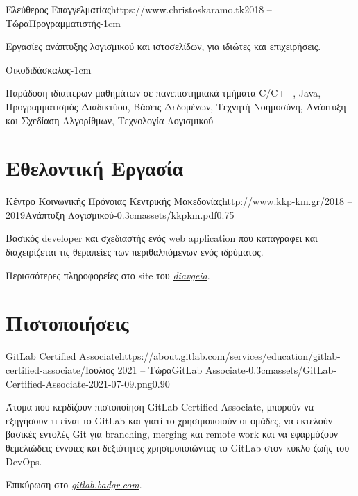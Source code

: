 \documentclass{mycv}
\begin{document}
	\begin{EntryDated}{Ελεύθερος Επαγγελματίας}{https://www.christoskaramo.tk}{2018 -- Τώρα}{Προγραμματιστής}{-1cm}
	\begin{Itemize}
		\item Εργασίες ανάπτυξης λογισμικού και ιστοσελίδων, για ιδιώτες και επιχειρήσεις.
	\end{Itemize}
	\end{EntryDated}

	\vspace*{-1.2cm}

	\begin{EntryDated}{}{}{}{Οικοδιδάσκαλος}{-1cm}
		\begin{Itemize}
			\item Παράδοση ιδιαίτερων μαθημάτων σε πανεπιστημιακά τμήματα C/C++, Java, Προγραμματισμός Διαδικτύου, Βάσεις Δεδομένων, Τεχνητή Νοημοσύνη, Ανάπτυξη και Σχεδίαση Αλγορίθμων, Τεχνολογία Λογισμικού
		\end{Itemize}
	\end{EntryDated}
	
	\section{Εθελοντική Εργασία}
	\begin{EntryDatedLogo}{Κέντρο Κοινωνικής Πρόνοιας Κεντρικής Μακεδονίας}{http://www.kkp-km.gr/}{2018 -- 2019}{Ανάπτυξη Λογισμικού}{-0.3cm}{assets/kkpkm.pdf}{0.75}
		\begin{Itemize}
			\item Βασικός developer και σχεδιαστής ενός web application που καταγράφει και διαχειρίζεται τις θεραπείες των περιθαλπόμενων ενός ιδρύματος.
			\item Περισσότερες πληροφορείες στο site του  \href{https://diavgeia.gov.gr/decision/view/\%CE\%A8\%CE\%A6\%CE\%A1\%CE\%93\%CE\%9F\%CE\%9E\%CE\%A7\%CE\%A3-\%CE\%A0\%CE\%93\%CE\%A6}{\textit{diavgeia}}.
		\end{Itemize}
	\end{EntryDatedLogo}

	\section{Πιστοποιήσεις}
    \begin{EntryDatedLogo}{GitLab Certified Associate}{https://about.gitlab.com/services/education/gitlab-certified-associate/}{Ιούλιος 2021 -- Τώρα}{GitLab Associate}{-0.3cm}{assets/GitLab-Certified-Associate-2021-07-09.png}{0.90}
		\begin{Itemize}
			\item Άτομα που κερδίζουν πιστοποίηση GitLab Certified Associate, μπορούν να εξηγήσουν τι είναι το GitLab και γιατί το χρησιμοποιούν οι ομάδες, να εκτελούν βασικές εντολές Git για branching, merging και remote work και να εφαρμόζουν θεμελιώδεις έννοιες και δεξιότητες χρησιμοποιώντας το GitLab στον κύκλο ζωής του DevOps. 
			\item Επικύρωση στο \href{https://gitlab.badgr.com/public/assertions/Hw6j8Th9SyKNj8ehsQkqAw}{\textit{gitlab.badgr.com}}.
		\end{Itemize}
	\end{EntryDatedLogo}
	
\end{document}
